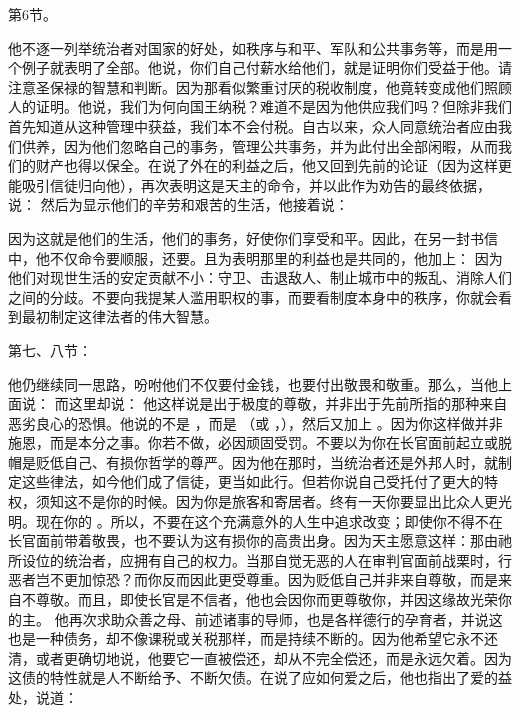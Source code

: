 第6节。 \par

他不逐一列举统治者对国家的好处，如秩序与和平、军队和公共事务等，而是用一个例子就表明了全部。他说，你们自己付薪水给他们，就是证明你们受益于他。请注意圣保禄的智慧和判断。因为那看似繁重讨厌的税收制度，他竟转变成他们照顾人的证明。他说，我们为何向国王纳税？难道不是因为他供应我们吗？但除非我们首先知道从这种管理中获益，我们本不会付税。自古以来，众人同意统治者应由我们供养，因为他们忽略自己的事务，管理公共事务，并为此付出全部闲暇，从而我们的财产也得以保全。在说了外在的利益之后，他又回到先前的论证（因为这样更能吸引信徒归向他），再次表明这是天主的命令，并以此作为劝告的最终依据，说： 然后为显示他们的辛劳和艰苦的生活，他接着说：\par

\par

因为这就是他们的生活，他们的事务，好使你们享受和平。因此，在另一封书信中，他不仅命令要顺服，还要。且为表明那里的利益也是共同的，他加上：  因为他们对现世生活的安定贡献不小：守卫、击退敌人、制止城市中的叛乱、消除人们之间的分歧。不要向我提某人滥用职权的事，而要看制度本身中的秩序，你就会看到最初制定这律法者的伟大智慧。\par

第七、八节：\par

他仍继续同一思路，吩咐他们不仅要付金钱，也要付出敬畏和敬重。那么，当他上面说： 而这里却说： 他这样说是出于极度的尊敬，并非出于先前所指的那种来自恶劣良心的恐惧。他说的不是 ，而是 （或 ，），然后又加上 。因为你这样做并非施恩，而是本分之事。你若不做，必因顽固受罚。不要以为你在长官面前起立或脱帽是贬低自己、有损你哲学的尊严。因为他在那时，当统治者还是外邦人时，就制定这些律法，如今他们成了信徒，更当如此行。但若你说自己受托付了更大的特权，须知这不是你的时候。因为你是旅客和寄居者。终有一天你要显出比众人更光明。现在你的 。所以，不要在这个充满意外的人生中追求改变；即使你不得不在长官面前带着敬畏，也不要认为这有损你的高贵出身。因为天主愿意这样：那由祂所设位的统治者，应拥有自己的权力。当那自觉无恶的人在审判官面前战栗时，行恶者岂不更加惊恐？而你反而因此更受尊重。因为贬低自己并非来自尊敬，而是来自不尊敬。而且，即使长官是不信者，他也会因你而更尊敬你，并因这缘故光荣你的主。 他再次求助众善之母、前述诸事的导师，也是各样德行的孕育者，并说这也是一种债务，却不像课税或关税那样，而是持续不断的。因为他希望它永不还清，或者更确切地说，他要它一直被偿还，却从不完全偿还，而是永远欠着。因为这债的特性就是人不断给予、不断欠债。在说了应如何爱之后，他也指出了爱的益处，说道：\par

